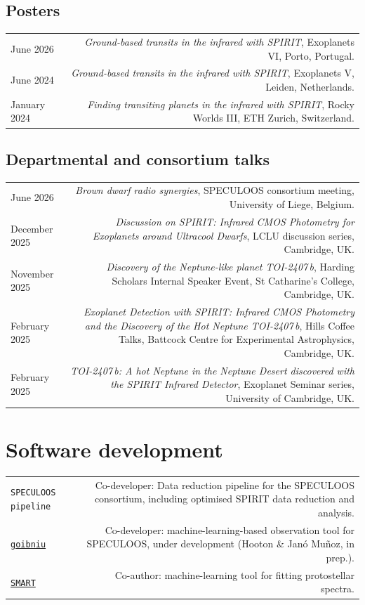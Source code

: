 \documentclass{article}
\begin{document}
\subsection*{Posters}
\begin{tabular}{L!{\vrule}R}
    June 2026 & \textit{Ground-based transits in the infrared with SPIRIT}, Exoplanets VI, Porto, Portugal. \\
    June 2024 & \textit{Ground-based transits in the infrared with SPIRIT}, Exoplanets V, Leiden, Netherlands. \\
    January 2024 & \textit{Finding transiting planets in the infrared with SPIRIT}, Rocky Worlds III, ETH Zurich, Switzerland. \\
\end{tabular}

\subsection*{Departmental and consortium talks}
\begin{tabular}{L!{\vrule}R}
    June 2026 & \textit{Brown dwarf radio synergies}, SPECULOOS consortium meeting, University of Liege, Belgium. \\
    December 2025 & \textit{Discussion on SPIRIT: Infrared CMOS Photometry for Exoplanets around Ultracool Dwarfs}, LCLU discussion series, Cambridge, UK. \\
    November 2025 & \textit{Discovery of the Neptune-like planet TOI-2407\,b}, Harding Scholars Internal Speaker Event, St Catharine's College, Cambridge, UK. \\
    February 2025 & \textit{Exoplanet Detection with SPIRIT: Infrared CMOS Photometry and the Discovery of the Hot Neptune TOI-2407\,b}, Hills Coffee Talks, Battcock Centre for Experimental Astrophysics, Cambridge, UK. \\
    February 2025 & \textit{TOI-2407\,b: A hot Neptune in the Neptune Desert discovered with the SPIRIT Infrared Detector}, Exoplanet Seminar series, University of Cambridge, UK. \\
\end{tabular}

\section*{Software development}
\begin{tabular}{L!{\vrule}R}
  \texttt{SPECULOOS pipeline} & Co-developer: Data reduction pipeline for the SPECULOOS consortium, including optimised SPIRIT data reduction and analysis. \\
  \href{https://github.com/mhooton/goibniu}{\texttt{goibniu}} & Co-developer: machine-learning-based observation tool for SPECULOOS, under development (Hooton \& Janó Muñoz, in prep.). \\ %
  \href{https://github.com/claudiajanomunoz/SMART}{\texttt{SMART}} & Co-author: machine-learning tool for fitting protostellar spectra. \\
\end{tabular}
\end{document}
